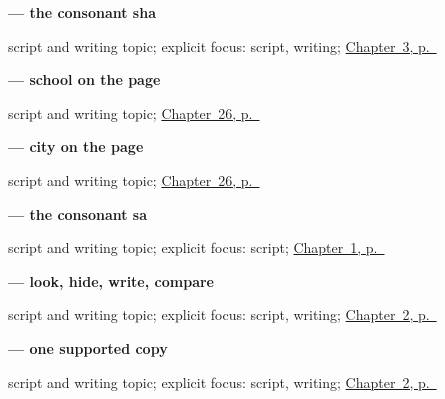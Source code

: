 \noindent\begin{minipage}[t]{\linewidth}
\raggedright
\textbf{ — the consonant sha}\par
\footnotesize script and writing topic; explicit focus: script, writing; \hyperref[ch:gu-doorway-forms]{Chapter~3, p.~\pageref*{ch:gu-doorway-forms}}
\end{minipage}\par\smallskip

\noindent\begin{minipage}[t]{\linewidth}
\raggedright
\textbf{ — school on the page}\par
\footnotesize script and writing topic; \hyperref[ch:gu-city-school-road]{Chapter~26, p.~\pageref*{ch:gu-city-school-road}}
\end{minipage}\par\smallskip

\noindent\begin{minipage}[t]{\linewidth}
\raggedright
\textbf{ — city on the page}\par
\footnotesize script and writing topic; \hyperref[ch:gu-city-school-road]{Chapter~26, p.~\pageref*{ch:gu-city-school-road}}
\end{minipage}\par\smallskip

\noindent\begin{minipage}[t]{\linewidth}
\raggedright
\textbf{ — the consonant sa}\par
\footnotesize script and writing topic; explicit focus: script; \hyperref[ch:first-greeting-script]{Chapter~1, p.~\pageref*{ch:first-greeting-script}}
\end{minipage}\par\smallskip

\noindent\begin{minipage}[t]{\linewidth}
\raggedright
\textbf{ — look, hide, write, compare}\par
\footnotesize script and writing topic; explicit focus: script, writing; \hyperref[ch:greetings]{Chapter~2, p.~\pageref*{ch:greetings}}
\end{minipage}\par\smallskip

\noindent\begin{minipage}[t]{\linewidth}
\raggedright
\textbf{ — one supported copy}\par
\footnotesize script and writing topic; explicit focus: script, writing; \hyperref[ch:greetings]{Chapter~2, p.~\pageref*{ch:greetings}}
\end{minipage}\par\smallskip

